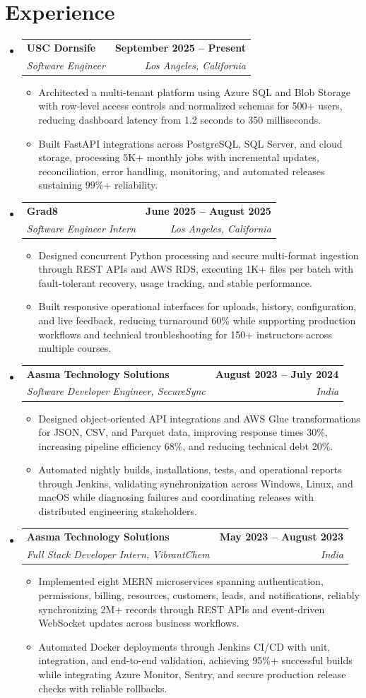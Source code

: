 \documentclass[letterpaper,10pt]{article}
\makeatletter
\newcommand{\itemTail}{\vspace{-5pt}}
\newcommand{\sectionGap}{\vspace{-8pt}}
\newcommand{\roleGap}{\vspace{2pt}}
\newcommand{\resumeItem}[1]{\item\small{{#1 \itemTail}}}
\newcommand{\resumeSubheading}[4]{\vspace{-1pt}\item\begin{tabular*}{1.0\textwidth}[t]{l@{\extracolsep{\fill}}r}\textbf{#1} & \textbf{\small #2} \\\textit{\small#3} & \textit{\small #4} \\\end{tabular*}\vspace{-2pt}}
\newcommand{\resumeSubHeadingListStart}{\begin{itemize}[leftmargin=0.0in, label={}]}
\newcommand{\resumeSubHeadingListEnd}{\end{itemize}}
\newcommand{\resumeItemListStart}{\begin{itemize}[leftmargin=0.15in,label=\textbullet,itemsep=3pt,topsep=0pt,parsep=0pt,partopsep=0pt]}
\newcommand{\resumeItemListEnd}{\end{itemize}\vspace{-4pt}}
\makeatother
\begin{document}
\section{Experience}
\resumeSubHeadingListStart
\resumeSubheading{USC Dornsife}{September 2025 -- Present}{Software Engineer}{Los Angeles, California}
\resumeItemListStart
\resumeItem{Architected a multi-tenant platform using Azure SQL and Blob Storage with row-level access controls and normalized schemas for 500+ users, reducing dashboard latency from 1.2 seconds to 350 milliseconds.}
\resumeItem{Built FastAPI integrations across PostgreSQL, SQL Server, and cloud storage, processing 5K+ monthly jobs with incremental updates, reconciliation, error handling, monitoring, and automated releases sustaining 99\%+ reliability.}
\resumeItemListEnd
\roleGap
\resumeSubheading{Grad8}{June 2025 -- August 2025}{Software Engineer Intern}{Los Angeles, California}
\resumeItemListStart
\resumeItem{Designed concurrent Python processing and secure multi-format ingestion through REST APIs and AWS RDS, executing 1K+ files per batch with fault-tolerant recovery, usage tracking, and stable performance.}
\resumeItem{Built responsive operational interfaces for uploads, history, configuration, and live feedback, reducing turnaround 60\% while supporting production workflows and technical troubleshooting for 150+ instructors across multiple courses.}
\resumeItemListEnd
\roleGap
\resumeSubheading{Aasma Technology Solutions}{August 2023 -- July 2024}{Software Developer Engineer, SecureSync}{India}
\resumeItemListStart
\resumeItem{Designed object-oriented API integrations and AWS Glue transformations for JSON, CSV, and Parquet data, improving response times 30\%, increasing pipeline efficiency 68\%, and reducing technical debt 20\%.}
\resumeItem{Automated nightly builds, installations, tests, and operational reports through Jenkins, validating synchronization across Windows, Linux, and macOS while diagnosing failures and coordinating releases with distributed engineering stakeholders.}
\resumeItemListEnd
\roleGap
\resumeSubheading{Aasma Technology Solutions}{May 2023 -- August 2023}{Full Stack Developer Intern, VibrantChem}{India}
\resumeItemListStart
\resumeItem{Implemented eight MERN microservices spanning authentication, permissions, billing, resources, customers, leads, and notifications, reliably synchronizing 2M+ records through REST APIs and event-driven WebSocket updates across business workflows.}
\resumeItem{Automated Docker deployments through Jenkins CI/CD with unit, integration, and end-to-end validation, achieving 95\%+ successful builds while integrating Azure Monitor, Sentry, and secure production release checks with reliable rollbacks.}
\resumeItemListEnd
\resumeSubHeadingListEnd
\sectionGap
\end{document}
